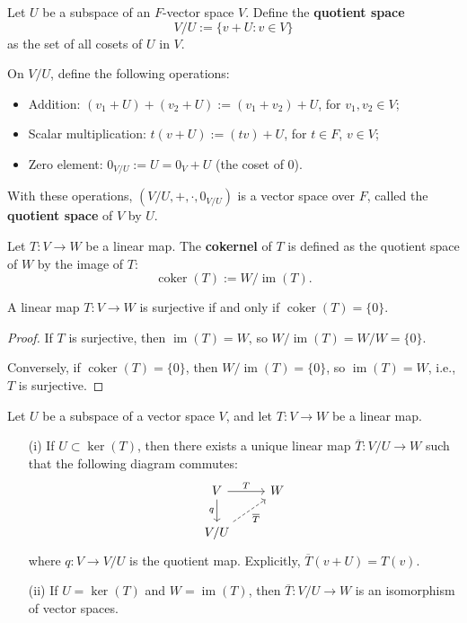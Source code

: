 \begin{definition}
  Let $U$ be a subspace of an $F$-vector space $V$. Define the \textbf{quotient space}
  \[
    V/U := \{ v + U : v \in V \}
  \]
  as the set of all cosets of $U$ in $V$.

  On $V/U$, define the following operations:
  \begin{itemize}
    \item Addition: $(v_1 + U) + (v_2 + U) := (v_1 + v_2) + U$, for $v_1, v_2 \in V$;
    \item Scalar multiplication: $t(v + U) := (tv) + U$, for $t \in F$, $v \in V$;
    \item Zero element: $0_{V/U} := U = 0_V + U$ (the coset of $0$).
  \end{itemize}

  With these operations, $(V/U, +, \cdot, 0_{V/U})$ is a vector space over $F$, called the \textbf{quotient space} of $V$ by $U$.
\end{definition}

\begin{definition}[Cokernel]
  Let $T: V \to W$ be a linear map. The \textbf{cokernel} of $T$ is defined as the quotient space of $W$ by the image of $T$:
  \[
    \operatorname{coker}(T) := W / \operatorname{im}(T).
  \]
\end{definition}

\begin{proposition}
  A linear map $T: V \to W$ is surjective if and only if $\operatorname{coker}(T) = \{0\}$.
\end{proposition}

\begin{proof}
  If $T$ is surjective, then $\operatorname{im}(T) = W$, so $W / \operatorname{im}(T) = W / W = \{0\}$.

  Conversely, if $\operatorname{coker}(T) = \{0\}$, then $W / \operatorname{im}(T) = \{0\}$, so $\operatorname{im}(T) = W$, i.e., $T$ is surjective.
\end{proof}

\begin{proposition}
  Let $U$ be a subspace of a vector space $V$, and let $T: V \to W$ be a linear map.
  \begin{enumerate}
    \item[(i)] If $U \subset \ker(T)$, then there exists a unique linear map $\overline{T}: V/U \to W$ such that the following diagram commutes:
      \[
        \begin{tikzcd}
          V \arrow[r, "T"] \arrow[d, "q"'] & W \\
          V/U \arrow[ur, "\overline{T}"', dashed]
        \end{tikzcd}
      \]
      where $q: V \to V/U$ is the quotient map. Explicitly, $\overline{T}(v + U) = T(v)$.

    \item[(ii)] If $U = \ker(T)$ and $W = \operatorname{im}(T)$, then $\overline{T}: V/U \to W$ is an isomorphism of vector spaces.
  \end{enumerate}
\end{proposition}

